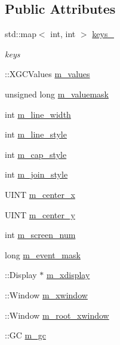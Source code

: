 \subsection*{Public Attributes}
\begin{DoxyCompactItemize}
\item 
std::map$<$ int, int $>$ \hyperlink{classnebula_1_1platform_1_1window_1_1lin_1_1base_a2d1f7ebc4e8cdbab2553e0ae344af178}{keys\_\-}
\begin{DoxyCompactList}\small\item\em keys \item\end{DoxyCompactList}\item 
::XGCValues \hyperlink{classnebula_1_1platform_1_1window_1_1lin_1_1base_ad43cdc274bbb7e66479814e98887880b}{m\_\-values}
\item 
unsigned long \hyperlink{classnebula_1_1platform_1_1window_1_1lin_1_1base_a6b248827e2b0465085540e494debc43b}{m\_\-valuemask}
\item 
int \hyperlink{classnebula_1_1platform_1_1window_1_1lin_1_1base_ac87241d1655c8081bb222b2d8ace36e7}{m\_\-line\_\-width}
\item 
int \hyperlink{classnebula_1_1platform_1_1window_1_1lin_1_1base_abf55d575bab55e744730d2faa62901c9}{m\_\-line\_\-style}
\item 
int \hyperlink{classnebula_1_1platform_1_1window_1_1lin_1_1base_aa586adfb426345cea9f1b77e0bff11d5}{m\_\-cap\_\-style}
\item 
int \hyperlink{classnebula_1_1platform_1_1window_1_1lin_1_1base_ad95f3f346ef12ae75b28a15b572867c3}{m\_\-join\_\-style}
\item 
UINT \hyperlink{classnebula_1_1platform_1_1window_1_1lin_1_1base_aa71dac0b114e6d95a1e0fbcbbecd1bd6}{m\_\-center\_\-x}
\item 
UINT \hyperlink{classnebula_1_1platform_1_1window_1_1lin_1_1base_a50a9c7422b5017396c18ec646bcc0f1c}{m\_\-center\_\-y}
\item 
int \hyperlink{classnebula_1_1platform_1_1window_1_1lin_1_1base_a4f47d93e9e4897a9d26b7e4ffa726429}{m\_\-screen\_\-num}
\item 
long \hyperlink{classnebula_1_1platform_1_1window_1_1lin_1_1base_a5e531bf83fd9a14f1bde5b880bf1d64a}{m\_\-event\_\-mask}
\item 
::Display $\ast$ \hyperlink{classnebula_1_1platform_1_1window_1_1lin_1_1base_a06a95115e359f15e213bd0b8c3234526}{m\_\-xdisplay}
\item 
::Window \hyperlink{classnebula_1_1platform_1_1window_1_1lin_1_1base_aca6ba787d38d9383b56d5844b4f53843}{m\_\-xwindow}
\item 
::Window \hyperlink{classnebula_1_1platform_1_1window_1_1lin_1_1base_aeeb21f9b5859adce56ec5114f4cf9dc6}{m\_\-root\_\-xwindow}
\item 
::GC \hyperlink{classnebula_1_1platform_1_1window_1_1lin_1_1base_a6d601e21b61eefa641a9abd28bbdb36f}{m\_\-gc}
\end{DoxyCompactItemize}


